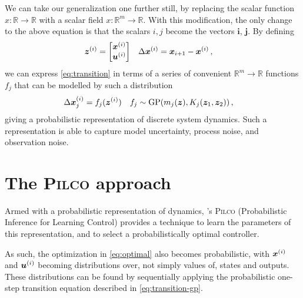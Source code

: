 \documentclass[main.tex]{subfiles}
\begin{document}
	We can take our generalization one further still, by replacing the scalar function $x\colon \mathbb{R} \to \mathbb{R}$ with a scalar field $x\colon \mathbb{R}^m \to \mathbb{R}$.
	With this modification, the only change to the above equation is that the scalars $i,j$ become the vectors $\bm{i}$, $\bm{j}$.
	By defining
	\begin{align}
		\bm{z}^{(i)} &= \begin{bmatrix}\bm{x}^{(i)} \\ \bm{u}^{(i)}\end{bmatrix} &
		\Delta\bm{x}^{(i)} &= \bm{x}_{i + 1} - \bm{x}^{(i)}\,,
	\end{align}
	we can express \cref{eq:transition} in terms of a series of convenient $\mathbb{R}^m \to \mathbb{R}$ functions $f_j$ that can be modelled by such a distribution
	\begin{align}
		\Delta\bm{x}^{(i)}_j &= f_j(\bm{z}^{(i)}) & f_j &\sim \mathrm{GP}(m_j(\bm{z}), K_j(\bm{z}_1, \bm{z}_2))\,, \label{eq:transition-gp}
	\end{align}
	giving a probabilistic representation of discrete system dynamics.
	Such a representation is able to capture model uncertainty, process noise, and observation noise.

\section{The \textsc{Pilco} approach}

	Armed with a probabilistic representation of dynamics, \citeauthor{pilco}'s \textsc{Pilco} \cite{pilco} (Probabilistic Inference for Learning Control) provides a technique to learn the parameters of this representation, and to select a probabilistically optimal controller.

	As such, the optimization in \cref{eq:optimal} also becomes probabilistic\footnotemark, with $\bm{x}^{(i)}$ and $\bm{u}^{(i)}$ becoming distributions over, not simply values of, states and outputs. These distributions can be found by sequentially applying the probabilistic one-step transition equation described in \cref{eq:transition-gp}.

\end{document}
